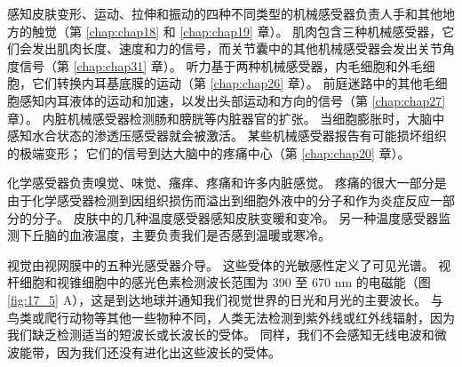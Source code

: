 感知皮肤变形、运动、拉伸和振动的四种不同类型的机械感受器负责人手和其他地方的触觉（第 \ref{chap:chap18} 和 \ref{chap:chap19} 章）。 
肌肉包含三种机械感受器，它们会发出肌肉长度、速度和力的信号，而关节囊中的其他机械感受器会发出关节角度信号（第 \ref{chap:chap31} 章）。 
听力基于两种机械感受器，内毛细胞和外毛细胞，它们转换内耳基底膜的运动（第 \ref{chap:chap26} 章）。 
前庭迷路中的其他毛细胞感知内耳液体的运动和加速，以发出头部运动和方向的信号（第 \ref{chap:chap27} 章）。 
内脏机械感受器检测肠和膀胱等内脏器官的扩张。 
当细胞膨胀时，大脑中感知水合状态的渗透压感受器就会被激活。 
某些机械感受器报告有可能损坏组织的极端变形； 
它们的信号到达大脑中的疼痛中心（第 \ref{chap:chap20} 章）。


化学感受器负责嗅觉、味觉、瘙痒、疼痛和许多内脏感觉。 
疼痛的很大一部分是由于化学感受器检测到因组织损伤而溢出到细胞外液中的分子和作为炎症反应一部分的分子。 
皮肤中的几种温度感受器感知皮肤变暖和变冷。 
另一种温度感受器监测下丘脑的血液温度，主要负责我们是否感到温暖或寒冷。


视觉由视网膜中的五种光感受器介导。 
这些受体的光敏感性定义了可见光谱。 
视杆细胞和视锥细胞中的感光色素检测波长范围为 390 至 670 nm 的电磁能（图 \ref{fig:17_5} A），这是到达地球并通知我们视觉世界的日光和月光的主要波长。 
与鸟类或爬行动物等其他一些物种不同，人类无法检测到紫外线或红外线辐射，因为我们缺乏检测适当的短波长或长波长的受体。 
同样，我们不会感知无线电波和微波能带，因为我们还没有进化出这些波长的受体。

